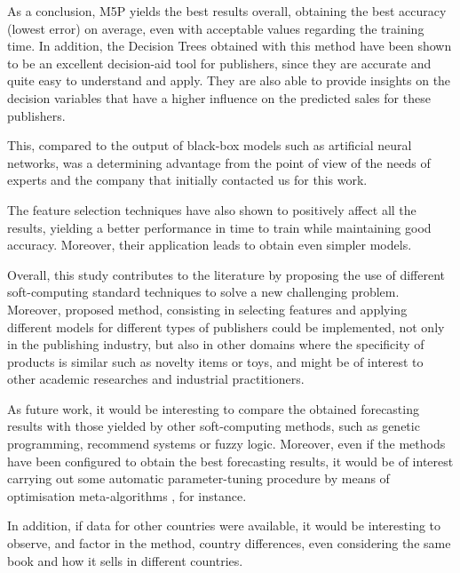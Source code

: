 \documentclass[a4paper,10pt,twocolumn,preprint,3p]{elsarticle}
\begin{document}
As a conclusion, M5P yields the best results overall, obtaining the best accuracy 
(lowest error) on average, even with acceptable values regarding the training time.
In addition, the Decision Trees obtained with this method have been
shown to be an excellent decision-aid tool for publishers, since they are accurate 
and quite easy to understand and apply. 
They are also able to provide insights on the decision variables that
have a higher influence on the predicted sales for these publishers. 

This, compared to the output of black-box models such as artificial
neural networks, was a determining advantage from the point of view of
the needs of experts and the company that initially contacted us for
this work. 

The feature selection techniques have also shown to positively affect
all the results, yielding a better performance in time to train while
maintaining good accuracy. Moreover, their application leads to obtain
even simpler models. 

Overall, this study contributes to the literature by proposing the use
of different soft-computing standard techniques to solve a new
challenging problem. 
Moreover, proposed method, consisting in selecting features and
applying different models for different types of publishers could be
implemented, not only in the publishing  
industry, but also in other domains where the specificity of products
is similar such as novelty items or toys, and might be of interest to other 
academic researches and industrial practitioners.



As future work, it would be interesting to compare the obtained
forecasting results with those yielded by other soft-computing
methods, such as genetic programming, recommend systems or fuzzy logic. 
Moreover, even if the methods have been configured to obtain the best
forecasting results, it would be of interest carrying out some
automatic parameter-tuning procedure by means of optimisation
meta-algorithms \cite{huang2006ga,Mookiah2013_EA_Tuning,Shen2016_FFly_Tuning},  
for instance. 

In addition, if data for other countries were available, it would be
interesting to observe, and factor in the method, country differences,
even considering the same book and how it sells in different
countries. 
\end{document}
